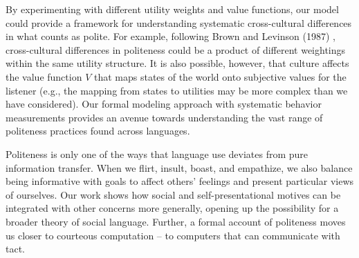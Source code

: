 \documentclass[9pt,twocolumn,twoside,lineno]{main_class_file}
\begin{document}
By experimenting with different utility weights and value functions, our
model could provide a framework for understanding systematic
cross-cultural differences in what counts as polite. For example,
following Brown and Levinson (1987) \cite{brown1987}, cross-cultural differences in
politeness could be a product of different weightings within the same
utility structure. It is also possible, however, that culture affects
the value function \(V\) that maps states of the world onto subjective
values for the listener (e.g., the mapping from states to utilities may
be more complex than we have considered). Our formal modeling approach
with systematic behavior measurements provides an avenue towards
understanding the vast range of politeness practices found across
languages.

Politeness is only one of the ways that language use deviates from pure
information transfer. When we flirt, insult, boast, and empathize, we
also balance being informative with goals to affect others' feelings and
present particular views of ourselves. Our work shows how social and
self-presentational motives can be integrated with other concerns more
generally, opening up the possibility for a broader theory of social
language. Further, a formal account of politeness moves us closer to
courteous computation -- to computers that can communicate with tact.
\end{document}
